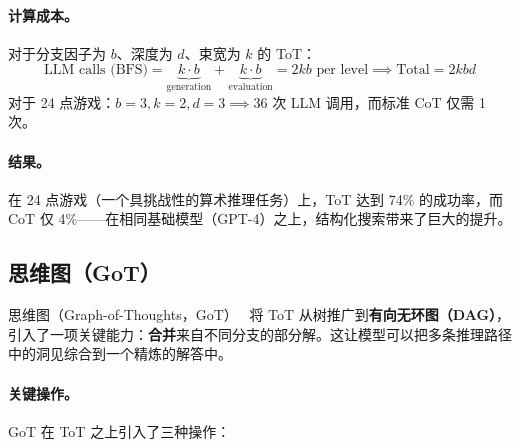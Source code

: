 \paragraph{计算成本。}
\label{computational-cost.}

对于分支因子为 $b$、深度为 $d$、束宽为 $k$ 的 ToT：
\begin{equation}
\text{LLM calls (BFS)} = \underbrace{k \cdot b}_{\text{generation}} + \underbrace{k \cdot b}_{\text{evaluation}} = 2kb \text{ per level} \implies \text{Total} = 2kbd
\end{equation}
对于 24 点游戏：$b=3, k=2, d=3 \implies 36$ 次 LLM 调用，而标准 CoT 仅需 1 次。

\paragraph{结果。}
\label{results.-dup2}

在 24 点游戏（一个具挑战性的算术推理任务）上，ToT 达到 74\% 的成功率，而 CoT 仅 4\%——在相同基础模型（GPT-4）之上，结构化搜索带来了巨大的提升。

\subsection{思维图（GoT）}
\label{subsec:got_method}

思维图（Graph-of-Thoughts，GoT）~\cite{besta2024graph} 将 ToT 从树推广到\textbf{有向无环图（DAG）}，引入了一项关键能力：\textbf{合并}来自不同分支的部分解。这让模型可以把多条推理路径中的洞见综合到一个精炼的解答中。

\paragraph{关键操作。}
\label{key-operations.}

GoT 在 ToT 之上引入了三种操作：

